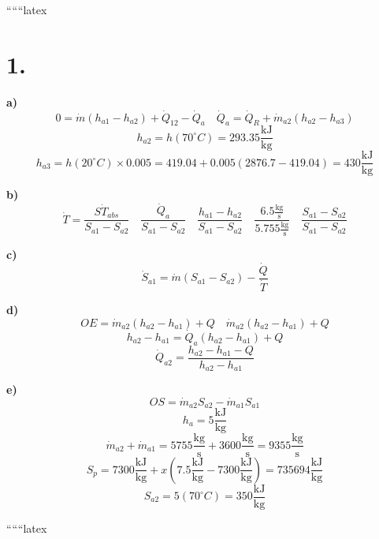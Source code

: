 
``````latex


\section*{1.}

\textbf{a)} \\
\[
0 = \dot{m} (h_{a1} - h_{a2}) + \dot{Q}_{12} - \dot{Q}_{a} \quad \dot{Q}_{a} = \dot{Q}_{R} + \dot{m}_{a2} (h_{a2} - h_{a3})
\]
\[
h_{a2} = h(70^\circ C) = 293.35 \frac{\text{kJ}}{\text{kg}}
\]
\[
h_{a3} = h(20^\circ C) \times 0.005 = 419.04 + 0.005 (2876.7 - 419.04) = 430 \frac{\text{kJ}}{\text{kg}}
\]

\textbf{b)} \\
\[
\dot{T} = \frac{S \dot{T}_{abs}}{S_{a1} - S_{a2}} \quad \frac{\dot{Q}_{a}}{S_{a1} - S_{a2}} \quad \frac{h_{a1} - h_{a2}}{S_{a1} - S_{a2}} \quad \frac{6.5 \frac{\text{kg}}{\text{s}}}{5.755 \frac{\text{kg}}{\text{s}}} \quad \frac{S_{a1} - S_{a2}}{S_{a1} - S_{a2}}
\]

\textbf{c)} \\
\[
\dot{S}_{a1} = \dot{m} (S_{a1} - S_{a2}) - \frac{\dot{Q}}{\dot{T}}
\]

\textbf{d)} \\
\[
OE = \dot{m}_{a2} (h_{a2} - h_{a1}) + Q \quad \dot{m}_{a2} (h_{a2} - h_{a1}) + Q
\]
\[
h_{a2} - h_{a1} = \dot{Q}_{a} (h_{a2} - h_{a1}) + Q
\]
\[
\dot{Q}_{a2} = \frac{h_{a2} - h_{a1} - Q}{h_{a2} - h_{a1}}
\]

\textbf{e)} \\
\[
OS = \dot{m}_{a2} S_{a2} - \dot{m}_{a1} S_{a1}
\]
\[
h_{a} = 5 \frac{\text{kJ}}{\text{kg}}
\]
\[
\dot{m}_{a2} + \dot{m}_{a1} = 5755 \frac{\text{kg}}{\text{s}} + 3600 \frac{\text{kg}}{\text{s}} = 9355 \frac{\text{kg}}{\text{s}}
\]
\[
S_{p} = 7300 \frac{\text{kJ}}{\text{kg}} + x (7.5 \frac{\text{kJ}}{\text{kg}} - 7300 \frac{\text{kJ}}{\text{kg}}) = 735694 \frac{\text{kJ}}{\text{kg}}
\]
\[
S_{a2} = 5 (70^\circ C) = 350 \frac{\text{kJ}}{\text{kg}}
\]

``````latex


